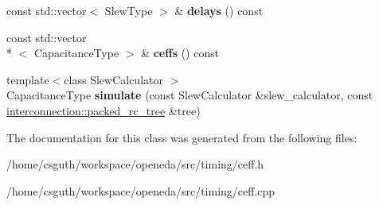 \begin{DoxyCompactItemize}
\item 
\hypertarget{classophidian_1_1timing_1_1effective__capacitance__wire__model_a210665426d271c9efb1fad0e6aee8549}{const std\-::vector$<$ Slew\-Type $>$ \& {\bfseries delays} () const }\label{classophidian_1_1timing_1_1effective__capacitance__wire__model_a210665426d271c9efb1fad0e6aee8549}

\item 
\hypertarget{classophidian_1_1timing_1_1effective__capacitance__wire__model_a51698d2c565a70e7e66c4a26a8e9befd}{const std\-::vector\\*
$<$ Capacitance\-Type $>$ \& {\bfseries ceffs} () const }\label{classophidian_1_1timing_1_1effective__capacitance__wire__model_a51698d2c565a70e7e66c4a26a8e9befd}

\item 
\hypertarget{classophidian_1_1timing_1_1effective__capacitance__wire__model_a33d191562404dd3358a1120e17326bfb}{{\footnotesize template$<$class Slew\-Calculator $>$ }\\Capacitance\-Type {\bfseries simulate} (const Slew\-Calculator \&slew\-\_\-calculator, const \hyperlink{classophidian_1_1interconnection_1_1packed__rc__tree}{interconnection\-::packed\-\_\-rc\-\_\-tree} \&tree)}\label{classophidian_1_1timing_1_1effective__capacitance__wire__model_a33d191562404dd3358a1120e17326bfb}

\end{DoxyCompactItemize}


The documentation for this class was generated from the following files\-:\begin{DoxyCompactItemize}
\item 
/home/csguth/workspace/openeda/src/timing/ceff.\-h\item 
/home/csguth/workspace/openeda/src/timing/ceff.\-cpp\end{DoxyCompactItemize}

